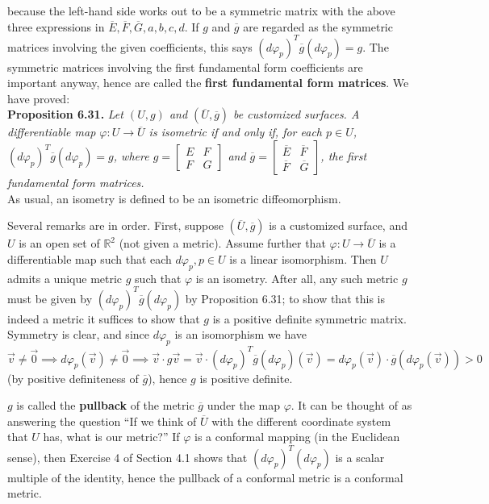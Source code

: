 \documentclass[leqno]{book}
\begin{document}
because the left-hand side works out to be a symmetric matrix with the above three expressions in $\overline E,\overline F,\overline G,a,b,c,d$.  If $g$ and $\overline g$ are regarded as the symmetric matrices involving the given coefficients, this says $(d\varphi_p)^T\overline g(d\varphi_p)=g$.  The symmetric matrices involving the first fundamental form coefficients are important anyway, hence are called the \textbf{first fundamental form matrices}.  We have proved:\\

\noindent\textbf{Proposition 6.31.} \emph{Let $(U,g)$ and $(\overline U,\overline g)$ be customized surfaces.  A differentiable map $\varphi:U\to\overline U$ is isometric if and only if, for each $p\in U$, $(d\varphi_p)^T\overline g(d\varphi_p)=g$, where $g=\begin{bmatrix}E&F\\F&G\end{bmatrix}$ and $\overline g=\begin{bmatrix}\overline E&\overline F\\\overline F&\overline G\end{bmatrix}$, the first fundamental form matrices.}\\

\noindent As usual, an isometry is defined to be an isometric diffeomorphism.

Several remarks are in order.  First, suppose $(\overline U,\overline g)$ is a customized surface, and $U$ is an open set of $\mathbb R^2$ (not given a metric).  Assume further that $\varphi:U\to\overline U$ is a differentiable map such that each $d\varphi_p,p\in U$ is a linear isomorphism.  Then $U$ admits a unique metric $g$ such that $\varphi$ is an isometry.  After all, any such metric $g$ must be given by $(d\varphi_p)^T\overline g(d\varphi_p)$ by Proposition 6.31; to show that this is indeed a metric it suffices to show that $g$ is a positive definite symmetric matrix.  Symmetry is clear, and since $d\varphi_p$ is an isomorphism we have
$$\vec v\ne\vec 0\implies d\varphi_p(\vec v)\ne\vec 0\implies\vec v\cdot g\vec v=\vec v\cdot(d\varphi_p)^T\overline g(d\varphi_p)(\vec v)=d\varphi_p(\vec v)\cdot\overline g(d\varphi_p(\vec v))>0$$
(by positive definiteness of $\overline g$), hence $g$ is positive definite.

$g$ is called the \textbf{pullback} of the metric $\overline g$ under the map $\varphi$.  It can be thought of as answering the question ``If we think of $\overline U$ with the different coordinate system that $U$ has, what is our metric?''  If $\varphi$ is a conformal mapping (in the Euclidean sense), then Exercise 4 of Section 4.1 shows that $(d\varphi_p)^T(d\varphi_p)$ is a scalar multiple of the identity, hence the pullback of a conformal metric is a conformal metric.
\end{document}
